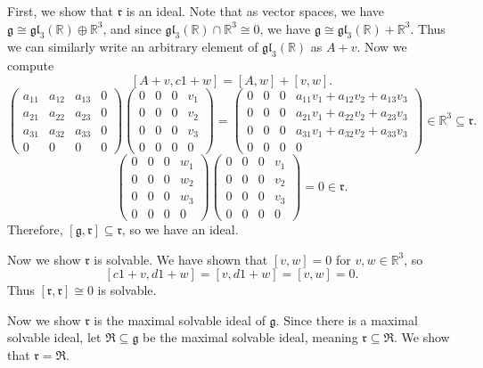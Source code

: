 \documentclass[11pt, letterpaper]{article}
\theoremstyle{plain}
\begin{document}
First, we show that $\mathfrak{r} $ is an ideal. Note that as vector spaces, we have $\mathfrak{g} \cong \mathfrak{gl} _3(\mathbb{R} )\oplus \mathbb{R} ^3$, and since $\mathfrak{gl} _3(\mathbb{R} )\cap \mathbb{R} ^3 \cong 0$, we have $\mathfrak{g} \cong \mathfrak{gl} _3(\mathbb{R} )+\mathbb{R} ^3$. Thus we can similarly write an arbitrary element of $\mathfrak{gl} _3(\mathbb{R} )$ as $A+v$. Now we compute
\[
	[A+v,c1+w] = [A,w] + [v,w]
.\]
\[
	\begin{pmatrix}
	a_{11}  & a_{12}  & a_{13}  & 0  \\
	a_{21}  & a_{22}  & a_{23}  & 0 \\
	a_{31}  & a_{32}  & a_{33}  & 0 \\
	0 & 0 & 0 & 0
	\end{pmatrix}\begin{pmatrix}
	0 & 0 & 0 & v_1 \\
	0 & 0 & 0 & v_2 \\
	0 & 0 & 0 & v_3 \\
	0 & 0 & 0 & 0
	\end{pmatrix}=\begin{pmatrix}
	0 & 0 & 0 & a_{11} v_1 + a_{12} v_2 + a_{13} v_3\\
	0 & 0 & 0 & a_{21} v_1 + a_{22} v_2 + a_{23} v_3 \\
	0 & 0 & 0 & a_{31} v_1 + a_{32} v_2 + a_{33} v_3 \\
	0 & 0 & 0 & 0
	\end{pmatrix}\in \mathbb{R} ^3 \subseteq \mathfrak{r} 
.\]
\[
	\begin{pmatrix}
	0 & 0 & 0 & w_1 \\
	0 & 0 & 0 & w_2 \\
	0 & 0 & 0 & w_3 \\
	0 & 0 & 0 & 0
	\end{pmatrix}\begin{pmatrix}
	0 & 0 & 0 & v_1 \\
	0 & 0 & 0 & v_2 \\
	0 & 0 & 0 & v_3 \\
	0 & 0 & 0 & 0
	\end{pmatrix}=0\in \mathfrak{r} 
.\]
Therefore, $[\mathfrak{g} ,\mathfrak{r} ]\subseteq \mathfrak{r} $, so we have an ideal.

Now we show $\mathfrak{r} $ is solvable. We have shown that $[v,w]=0$ for $v,w\in\mathbb{R} ^3$, so
\[
	[c1+v,d1+w] = [v,d1+w] = [v,w]=0
.\]
Thus $[\mathfrak{r} ,\mathfrak{r} ] \cong 0$ is solvable.

Now we show $\mathfrak{r} $ is the maximal solvable ideal of $\mathfrak{g} $. Since there is a maximal solvable ideal, let $\mathfrak{R} \subseteq \mathfrak{g} $ be the maximal solvable ideal, meaning $\mathfrak{r} \subseteq \mathfrak{R} $. We show that $\mathfrak{r} =\mathfrak{R} $.
\end{document}

